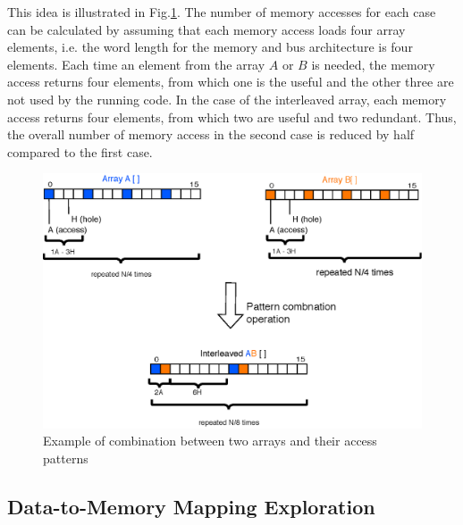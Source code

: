 \documentclass[prodmode,acmtecs]{acmsmall}
\begin{document}
This idea is illustrated in Fig.\ref{fig:algebra}.
The number of memory accesses for each case can be calculated by assuming that each memory access loads four array elements, i.e. the word length for the memory and bus architecture is four elements.
Each time an element from the array $A$ or $B$ is needed, the memory access returns four elements, from which one is the useful and the other three are not used by the running code.
In the case of the interleaved array, each memory access returns four elements, from which two are useful and two redundant.
Thus, the overall number of memory access in the second case is reduced by half compared to the first case.

\begin{figure}
\centering
	\includegraphics[scale = 0.6]{Images/Algebra.eps} 
	\caption{Example of combination between two arrays and their access patterns}
	\label{fig:algebra}
\end{figure}

\subsection{Data-to-Memory Mapping Exploration}
\end{document}
